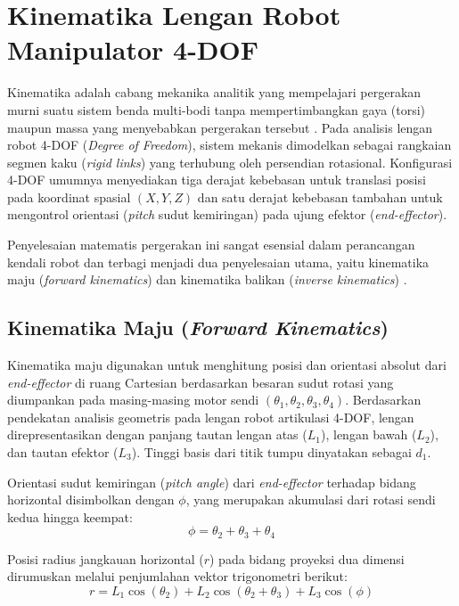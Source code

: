 \section{Kinematika Lengan Robot Manipulator 4-DOF}
Kinematika adalah cabang mekanika analitik yang mempelajari pergerakan murni suatu sistem benda multi-bodi tanpa mempertimbangkan gaya (torsi) maupun massa yang menyebabkan pergerakan tersebut \cite{craig2018}. Pada analisis lengan robot 4-DOF (\textit{Degree of Freedom}), sistem mekanis dimodelkan sebagai rangkaian segmen kaku (\textit{rigid links}) yang terhubung oleh persendian rotasional. Konfigurasi 4-DOF umumnya menyediakan tiga derajat kebebasan untuk translasi posisi pada koordinat spasial $(X,Y,Z)$ dan satu derajat kebebasan tambahan untuk mengontrol orientasi (\textit{pitch} sudut kemiringan) pada ujung efektor (\textit{end-effector}).

Penyelesaian matematis pergerakan ini sangat esensial dalam perancangan kendali robot dan terbagi menjadi dua penyelesaian utama, yaitu kinematika maju (\textit{forward kinematics}) dan kinematika balikan (\textit{inverse kinematics}) \cite{lynch2017}.

\subsection{Kinematika Maju (\textit{Forward Kinematics})}
Kinematika maju digunakan untuk menghitung posisi dan orientasi absolut dari \textit{end-effector} di ruang Cartesian berdasarkan besaran sudut rotasi yang diumpankan pada masing-masing motor sendi $(\theta_1, \theta_2, \theta_3, \theta_4)$. Berdasarkan pendekatan analisis geometris pada lengan robot artikulasi 4-DOF, lengan direpresentasikan dengan panjang tautan lengan atas ($L_1$), lengan bawah ($L_2$), dan tautan efektor ($L_3$). Tinggi basis dari titik tumpu dinyatakan sebagai $d_1$.

Orientasi sudut kemiringan (\textit{pitch angle}) dari \textit{end-effector} terhadap bidang horizontal disimbolkan dengan $\phi$, yang merupakan akumulasi dari rotasi sendi kedua hingga keempat:
\begin{equation}
\phi = \theta_2 + \theta_3 + \theta_4
\label{eq:phi}
\end{equation}

Posisi radius jangkauan horizontal ($r$) pada bidang proyeksi dua dimensi dirumuskan melalui penjumlahan vektor trigonometri berikut:
\begin{equation}
r = L_1 \cos(\theta_2) + L_2 \cos(\theta_2 + \theta_3) + L_3 \cos(\phi)
\label{eq:r}
\end{equation}

